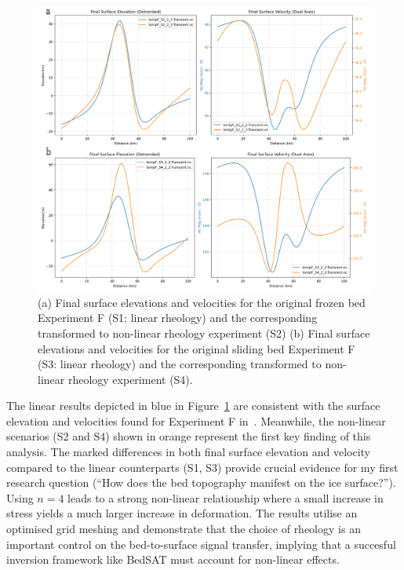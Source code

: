 \begin{figure}[H]
    \includegraphics[scale=0.40]{figures/combined_elevation_detrended_surface_velocity_['S1']_['S2']_['S3']_['S4'].png}
    \caption{(a) Final surface elevations and velocities for the original frozen bed Experiment F (S1: linear rheology) and the corresponding transformed to non-linear rheology experiment (S2) (b) Final surface elevations and velocities for the original sliding bed Experiment F (S3: linear rheology) and the corresponding transformed to non-linear rheology experiment (S4).}
    \label{fig:elev_vel_S1_S2_S3_S4}
\end{figure}
The linear results depicted in blue in Figure~\ref{fig:elev_vel_S1_S2_S3_S4} are consistent with the surface elevation and velocities found for Experiment F in~\cite{Pattyn_2008}. Meanwhile, the non-linear scenarios (S2 and S4) shown in orange  represent the first key finding of this analysis. The marked differences in both final surface elevation and velocity compared to the linear counterparts (S1, S3) provide crucial evidence for my first research question (``How does the bed topography manifest on the ice surface?''). Using $n = 4$ leads to a strong non-linear relationship where a small increase in stress yields a much larger increase in deformation. The results utilise an optimised grid meshing and demonstrate that the choice of rheology is an important control on the bed-to-surface signal transfer, implying that a succesful inversion framework like BedSAT must account for non-linear effects.
\newpage
